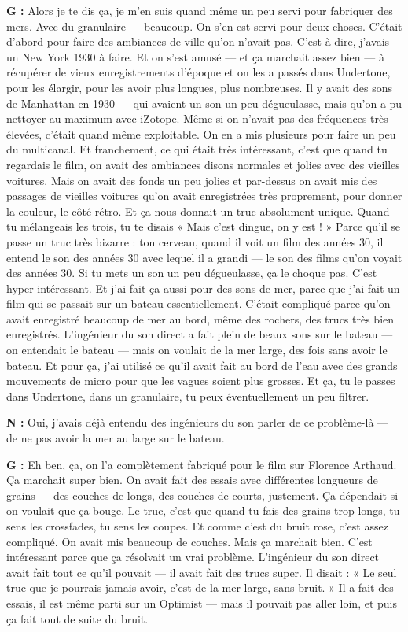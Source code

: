 ﻿\documentclass[12pt]{article}
\begin{document}
\textbf{G :} Alors je te dis ça, je m'en suis quand même un peu servi pour fabriquer des mers. Avec du granulaire — beaucoup. On s'en est servi pour deux choses. C'était d'abord pour faire des ambiances de ville qu'on n'avait pas. C'est-à-dire, j'avais un New York 1930 à faire. Et on s'est amusé — et ça marchait assez bien — à récupérer de vieux enregistrements d'époque et on les a passés dans Undertone, pour les élargir, pour les avoir plus longues, plus nombreuses. Il y avait des sons de Manhattan en 1930 — qui avaient un son un peu dégueulasse, mais qu'on a pu nettoyer au maximum avec iZotope. Même si on n'avait pas des fréquences très élevées, c'était quand même exploitable. On en a mis plusieurs pour faire un peu du multicanal. Et franchement, ce qui était très intéressant, c'est que quand tu regardais le film, on avait des ambiances disons normales et jolies avec des vieilles voitures. Mais on avait des fonds un peu jolies et par-dessus on avait mis des passages de vieilles voitures qu'on avait enregistrées très proprement, pour donner la couleur, le côté rétro. Et ça nous donnait un truc absolument unique. Quand tu mélangeais les trois, tu te disais « Mais c'est dingue, on y est ! » Parce qu'il se passe un truc très bizarre : ton cerveau, quand il voit un film des années 30, il entend le son des années 30 avec lequel il a grandi — le son des films qu'on voyait des années 30. Si tu mets un son un peu dégueulasse, ça le choque pas. C'est hyper intéressant. Et j'ai fait ça aussi pour des sons de mer, parce que j'ai fait un film qui se passait sur un bateau essentiellement. C'était compliqué parce qu'on avait enregistré beaucoup de mer au bord, même des rochers, des trucs très bien enregistrés. L'ingénieur du son direct a fait plein de beaux sons sur le bateau — on entendait le bateau — mais on voulait de la mer large, des fois sans avoir le bateau. Et pour ça, j'ai utilisé ce qu'il avait fait au bord de l'eau avec des grands mouvements de micro pour que les vagues soient plus grosses. Et ça, tu le passes dans Undertone, dans un granulaire, tu peux éventuellement un peu filtrer.

\textbf{N :} Oui, j'avais déjà entendu des ingénieurs du son parler de ce problème-là — de ne pas avoir la mer au large sur le bateau.

\textbf{G :} Eh ben, ça, on l'a complètement fabriqué pour le film sur Florence Arthaud. Ça marchait super bien. On avait fait des essais avec différentes longueurs de grains — des couches de longs, des couches de courts, justement. Ça dépendait si on voulait que ça bouge. Le truc, c'est que quand tu fais des grains trop longs, tu sens les crossfades, tu sens les coupes. Et comme c'est du bruit rose, c'est assez compliqué. On avait mis beaucoup de couches. Mais ça marchait bien. C'est intéressant parce que ça résolvait un vrai problème. L'ingénieur du son direct avait fait tout ce qu'il pouvait — il avait fait des trucs super. Il disait : « Le seul truc que je pourrais jamais avoir, c'est de la mer large, sans bruit. » Il a fait des essais, il est même parti sur un Optimist — mais il pouvait pas aller loin, et puis ça fait tout de suite du bruit.
\end{document}
